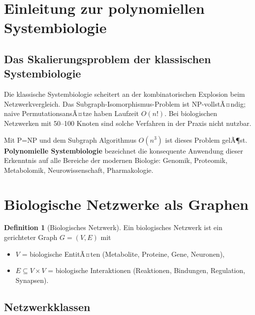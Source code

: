 ﻿\documentclass[a4paper,12pt]{scrreprt}
\theoremstyle{definition}
\newtheorem{definition}{Definition}[section]
\begin{document}
\section{Einleitung zur polynomiellen Systembiologie}

\subsection{Das Skalierungsproblem der klassischen Systembiologie}

Die klassische Systembiologie scheitert an der kombinatorischen
Explosion beim Netzwerkvergleich. Das Subgraph-Isomorphismus-Problem
ist NP-vollstÃ¤ndig; naive PermutationsansÃ¤tze haben Laufzeit $O(n!)$.
Bei biologischen Netzwerken mit 50--100 Knoten sind solche Verfahren
in der Praxis nicht nutzbar.

Mit P=NP und dem Subgraph Algorithmus $O(n^3)$ ist dieses Problem gelÃ¶st.
\textbf{Polynomielle Systembiologie} bezeichnet die konsequente
Anwendung dieser Erkenntnis auf alle Bereiche der modernen Biologie:
Genomik, Proteomik, Metabolomik, Neurowissenschaft, Pharmakologie.

\section{Biologische Netzwerke als Graphen}

\begin{definition}[Biologisches Netzwerk]
  Ein biologisches Netzwerk ist ein gerichteter Graph $G=(V,E)$ mit
  \begin{itemize}
    \item $V$ = biologische EntitÃ¤ten (Metabolite, Proteine, Gene,
      Neuronen),
    \item $E \subseteq V\times V$ = biologische Interaktionen
      (Reaktionen, Bindungen, Regulation, Synapsen).
  \end{itemize}
\end{definition}

\subsection{Netzwerkklassen}
\end{document}
